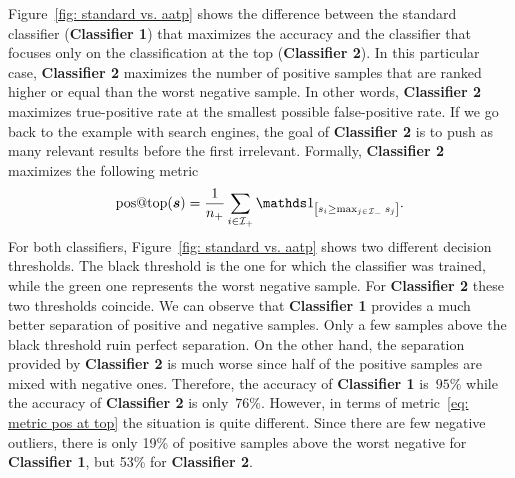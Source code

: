 Figure~\ref{fig: standard vs. aatp} shows the difference between the standard classifier (\textbf{Classifier 1}) that maximizes the accuracy and the classifier that focuses only on the classification at the top (\textbf{Classifier 2}). In this particular case, \textbf{Classifier 2} maximizes the number of positive samples that are ranked higher or equal than the worst negative sample. In other words, \textbf{Classifier 2} maximizes true-positive rate at the smallest possible false-positive rate. If we go back to the example with search engines, the goal of \textbf{Classifier 2} is to push as many relevant results before the first irrelevant. Formally, \textbf{Classifier 2} maximizes the following metric
\begin{equation}\label{eq: metric pos at top}
  \postop(\bm{s}) = \frac{1}{\npos} \sum_{i \in \Ipos} \Iverson{s_i \geq \max_{j \in \Ineg}s_j}.
\end{equation}
For both classifiers, Figure~\ref{fig: standard vs. aatp} shows two different decision thresholds. The black threshold is the one for which the classifier was trained, while the green one represents the worst negative sample. For \textbf{Classifier 2} these two thresholds coincide. We can observe that \textbf{Classifier 1} provides a much better separation of positive and negative samples. Only a few samples above the black threshold ruin perfect separation. On the other hand, the separation provided by \textbf{Classifier 2} is much worse since half of the positive samples are mixed with negative ones. Therefore, the accuracy of \textbf{Classifier 1} is~$95\%$ while the accuracy of \textbf{Classifier 2} is only~$76\%.$ However, in terms of metric~\eqref{eq: metric pos at top} the situation is quite different. Since there are few negative outliers, there is only 19\% of positive samples above the worst negative for \textbf{Classifier 1}, but 53\% for \textbf{Classifier 2}.

